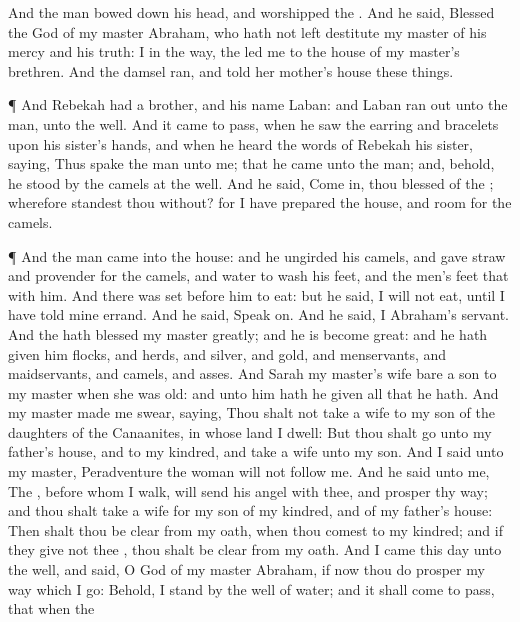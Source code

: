 {And the
man bowed down his
head, and
worshipped the
{}.
And he
said,
Blessed
{} the
{}
God of my
master
Abraham, who hath not left
destitute my
master of his
mercy and his
truth: I
{} in the
way, the
{} led
me to the
house of my
master’s
brethren.
And the
damsel
ran, and
told
{} her
mother’s
house these
things.
\par }{\PP {}¶ And
Rebekah had a
brother, and his
name
{}
Laban: and
Laban
ran
out unto the
man, unto the
well.
And it came to pass, when he
saw the
earring and
bracelets upon his
sister’s
hands, and when he
heard the
words of
Rebekah his
sister,
saying,
Thus
spake the
man unto me; that he
came unto the
man; and, behold, he
stood
by the
camels at the
well.
And he
said, Come
in, thou
blessed of the
{}; wherefore
standest thou
without? for I have
prepared the
house, and
room for the
camels.
\par }{\PP {}¶ And the
man
came into the
house: and he
ungirded his
camels, and
gave
straw and
provender for the
camels, and
water to
wash his
feet, and the
men’s
feet that
{} with him.
And there was
set
{} before
him to
eat: but he
said, I will not
eat, until I have
told mine
errand. And he
said, Speak
on.
And he
said, I
{}
Abraham’s
servant.
And the
{} hath
blessed my
master
greatly; and he is become
great: and he hath
given him
flocks, and
herds, and
silver, and
gold, and
menservants, and
maidservants, and
camels, and
asses.
And
Sarah my
master’s
wife
bare a
son to my
master
when she was
old: and unto him hath he
given all that he hath.
And my
master made me
swear,
saying, Thou shalt not
take a
wife to my
son of the
daughters of the
Canaanites, in whose
land I
dwell:
But thou shalt
go unto my
father’s
house, and to my
kindred, and
take a
wife unto my
son.
And I
said unto my
master, Peradventure the
woman will not
follow me.
And he
said unto me, The
{},
before whom I
walk, will
send his
angel with thee, and
prosper thy
way; and thou shalt
take a
wife for my
son of my
kindred, and of my
father’s
house:
Then shalt thou be
clear from
{} my
oath, when thou
comest to my
kindred; and if they
give not thee
{}, thou shalt be
clear from my
oath.
And I
came this
day unto the
well, and
said, O
{}
God of my
master
Abraham, if now thou
do
prosper my
way which I
go:
Behold, I
stand by the
well of
water; and it shall come to pass, that when the
}
